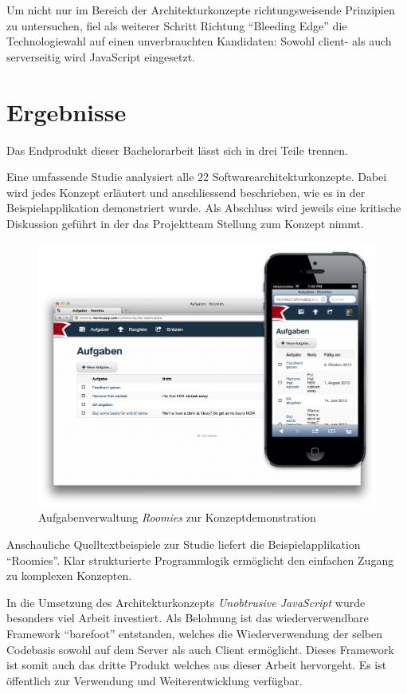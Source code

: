 Um nicht nur im Bereich der Architekturkonzepte richtungsweisende Prinzipien zu untersuchen, fiel als weiterer Schritt Richtung ``Bleeding Edge'' die Technologiewahl auf einen unverbrauchten Kandidaten: Sowohl client- als auch serverseitig wird JavaScript eingesetzt.


\section{Ergebnisse}

Das Endprodukt dieser Bachelorarbeit lässt sich in drei Teile trennen.

Eine umfassende Studie analysiert alle 22 Softwarearchitekturkonzepte. Dabei wird jedes Konzept erläutert und anschliessend beschrieben, wie es in der Beispielapplikation demonstriert wurde. Als Abschluss wird jeweils eine kritische Diskussion geführt in der das Projektteam Stellung zum Konzept nimmt.

\begin{figure}[H]
	\centering
	\includegraphics[width=12cm]{content/principle-demonstration/images/responsive-screenshots.png}
	\caption{Aufgabenverwaltung \emph{Roomies} zur Konzeptdemonstration}
\end{figure}

Anschauliche Quelltextbeispiele zur Studie liefert die Beispielapplikation ``Roomies''. Klar strukturierte Programmlogik ermöglicht den einfachen Zugang  zu komplexen Konzepten.

In die Umsetzung des Architekturkonzepts \emph{Unobtrusive JavaScript} wurde besonders viel Arbeit investiert. Als Belohnung ist das wiederverwendbare Framework ``barefoot'' entstanden, welches die Wiederverwendung der selben Codebasis sowohl auf dem Server als auch Client ermöglicht. Dieses Framework ist somit auch das dritte Produkt welches aus dieser Arbeit hervorgeht. Es ist öffentlich zur Verwendung und Weiterentwicklung verfügbar.



